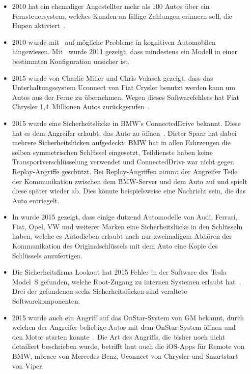 \begin{itemize}
    \item 2010 hat ein ehemaliger Angestellter mehr als 100 Autos über ein
Fernsteuersystem, welches Kunden an fällige Zahlungen erinnern soll, die Hupen
aktiviert~\cite{Poulsen2010}.
    \item 2010 wurde mit~\cite{Koscher2010} auf mögliche Probleme in kognitiven
Automobilen hingewiesen. Mit~\cite{Checkoway2011} wurde 2011 gezeigt, dass
mindestens ein Modell in einer bestimmten Konfiguration unsicher ist.
    \item  2015
wurde von Charlie Miller und Chris Valasek gezeigt, dass das
Unterhaltungssystem Uconnect von Fiat Crysler benutzt werden kann um Autos aus
der Ferne zu übernehmen. Wegen dieses Softwarefehlers hat Fiat Chrysler
1,4~Millionen Autos zurückgerufen~\cite{Gallagher2015}.
    \item 2015 wurde eine Sicherheitslücke in BMW's ConnectedDrive bekannt. Diese hat
es dem Angreifer erlaubt, das Auto zu öffnen~\cite{Spaar2015}. Dieter Spaar
hat dabei mehrere Sicherheitslücken aufgedeckt: BMW hat in allen Fahrzeugen
die selben symmetrischen Schlüssel eingesetzt, Teildienste haben keine
Transportverschlüsselung verwendet und ConnectedDrive war nicht gegen
Replay-Angriffe geschützt. Bei Replay-Angriffen nimmt der Angreifer Teile der
Kommunikation zwischen dem BMW-Server und dem Auto auf und spielt diese
später wieder ab. Dies könnte beispielsweise eine Nachricht sein, die das
Auto entriegelt.
    \item In \cite{Verdult2015} wurde 2015 gezeigt, dass einige dutzend Automodelle von
Audi, Ferrari, Fiat, Opel, VW und weiterer Marken eine Sicherheitslücke in den
Schlüsseln haben, welche es Autodieben erlaubt nach nur zweimaligem Abhören der
Kommunikation des Originalschlüssels mit dem Auto eine Kopie des Schlüssels
anzufertigen.
    \item Die Sicherheitsfirma Lookout hat 2015 Fehler in der Software des Tesla Model~S
gefunden, welche Root-Zugang zu internen Systemen erlaubt hat~\cite{Mahaffey2015}.
Drei der gefundenen sechs Sicherheitslücken sind veraltete Softwarekomponenten.
    \item 2015 wurde auch ein Angriff auf das OnStar-System von GM bekannt, durch welchen
der Angreifer beliebige Autos mit dem OnStar-System öffnen und den Motor
starten konnte~\cite{Stevens2015}. Die Art des Angriffs, die bisher noch nicht
detailiert beschrieben wurde, betrifft laut \cite{Greenberg2015} auch die
iOS-Apps für Remote von BMW, mbrace von Mercedes-Benz, Uconnect von Chrysler
und Smartstart von Viper.
\end{itemize}














